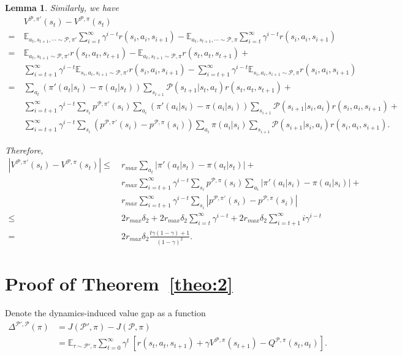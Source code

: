 \documentclass[letterpaper]{article} %
\def\E{{\mathbb{E}}}
\def\P{{\mathcal{P}}}
\newtheorem{lemma}[theorem]{Lemma}
\begin{document}
\begin{lemma}
Similarly, we have
{\small
\begin{align*}
&V^{\P,\pi'}(s_t)-V^{\P,\pi}(s_t)
\\
=\ &\E_{a_t,s_{t+1},\cdots\sim\P,\pi'}\sum_{i=t}^{\infty}\gamma^{i-t}r(s_i,a_i,s_{i+1})-
\E_{a_t,s_{t+1},\cdots\sim\P,\pi}\sum_{i=t}^{\infty}\gamma^{i-t}r(s_i,a_i,s_{i+1})
\\
=\ &\E_{a_t,s_{t+1}\sim\P,\pi'}r(s_t,a_t,s_{t+1})-\E_{a_t,s_{t+1}\sim\P,\pi}r(s_t,a_t,s_{t+1})+
\\
\ &\sum_{i=t+1}^{\infty}\gamma^{i-t}\E_{s_i,a_i,s_{i+1}\sim\P,\pi'}r(s_i,a_i,s_{i+1})-
\sum_{i=t+1}^{\infty}\gamma^{i-t}\E_{s_i,a_i,s_{i+1}\sim\P,\pi}r(s_i,a_i,s_{i+1})
\\
=\ &\sum_{a_t}\left(\pi'(a_t|s_t)-\pi(a_t|s_t)\right)\sum_{s_{t+1}}\P(s_{t+1}|s_t,a_t)r(s_t,a_t,s_{t+1})+
\\
\ &\sum_{i=t+1}^{\infty}\gamma^{i-t}\sum_{s_i}p^{\P,\pi'}(s_i)
\sum_{a_i}\left(\pi'(a_i|s_i)-\pi(a_i|s_i)\right)
\sum_{s_{i+1}}\P(s_{i+1}|s_i,a_i)r(s_i,a_i,s_{i+1})+
\\
\ &\sum_{i=t+1}^{\infty}\gamma^{i-t}\sum_{s_i}
\left(p^{\P,\pi'}(s_i)-p^{\P,\pi}(s_i)\right)
\sum_{a_i}\pi(a_i|s_i)
\sum_{s_{i+1}}\P(s_{i+1}|s_i,a_i)r(s_i,a_i,s_{i+1}).
\end{align*}
}\noindent

Therefore,
{\small
\begin{align*}
\left|V^{\P,\pi'}(s_t)-V^{\P,\pi}(s_t)\right|
\leq\ &
r_{max}\sum_{a_t}\left|\pi'(a_t|s_t)-\pi(a_t|s_t)\right|+
\\
\ &
r_{max}\sum_{i=t+1}^{\infty}\gamma^{i-t}\sum_{s_i}p^{\P,\pi}(s_i)
\sum_{a_i}\left|\pi'(a_i|s_i)-\pi(a_i|s_i)\right|+
\\
\ &
r_{max}\sum_{i=t+1}^{\infty}\gamma^{i-t}
\sum_{s_i}\left|
p^{\P,\pi'}(s_i)-p^{\P,\pi}(s_i)
\right|
\\
\leq\ &
2r_{max}\delta_2+2r_{max}\delta_2\sum_{i=t}^{\infty}\gamma^{i-t}
+2r_{max}\delta_2\sum_{i=t+1}^{\infty}i\gamma^{i-t}
\\
=\ &
2r_{max}\delta_2\frac{t\gamma(1-\gamma)+1}{(1-\gamma)^2}.
\end{align*}
}\noindent
\rightline{$\Box$}
\end{lemma}

\section{Proof of Theorem~\ref{theo:2}}
\label{sec:proof_theorem1}
\proof
Denote the dynamics-induced value gap as a function
{\small
\begin{align*}
\Delta^{\P',\P}(\pi)&=J(\P',\pi)-J(\P,\pi)
\\
&=\E_{\tau\sim \P',\pi}\sum_{t=0}^{\infty}\gamma^t\ 
\left[
r(s_t,a_t,s_{t+1})+\gamma V^{\P,\pi}(s_{t+1})-Q^{\P,\pi}(s_t,a_t)
\right].
\end{align*}
}\noindent
\end{document}
